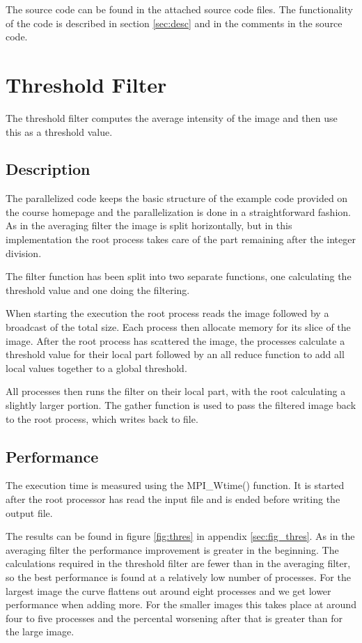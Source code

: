 \documentclass[a4paper, 12pt]{article}
\begin{document}
The source code can be found in the attached source code files.
The functionality of the code is described in section \ref{sec:desc} and in the
comments in the source code.

\section{Threshold Filter}
The threshold filter computes the average intensity of the image and then use
this as a threshold value.

\subsection{Description}
\label{sec:desc2}
The parallelized code keeps the basic structure of the example code provided on
the course homepage and the parallelization is done in a straightforward
fashion. As in the averaging filter the image is split horizontally, but in this
implementation the root process takes care of the part remaining after the
integer division.

The filter function has been split into two separate functions, one calculating the threshold
value and one doing the filtering.

When starting the execution the root process reads the image followed by a
broadcast of the total size. Each process then allocate memory for its slice of
the image. After the root process has scattered the image, the processes
calculate a threshold value for their local part followed by an all reduce
function to add all local values together to a global threshold.

All processes then runs the filter on their local part, with the root
calculating a slightly larger portion. The gather function is used to pass the
filtered image back to the root process, which writes back to file.

\subsection{Performance}

The execution time is measured using the MPI\_Wtime() function. It is started
after the root processor has read the input file
and is ended before writing the output file.

The results can be found in figure \ref{fig:thres} in appendix
\ref{sec:fig_thres}. As in the averaging filter the performance improvement is
greater in the beginning. The calculations required in the threshold filter are
fewer than in the averaging filter, so the best performance is found at a
relatively low number of processes. For the largest image the curve flattens
out around eight processes and we get lower performance when adding more. For
the smaller images this takes place at around four to five processes and the
percental worsening after that is greater than for the large image.
\end{document}
